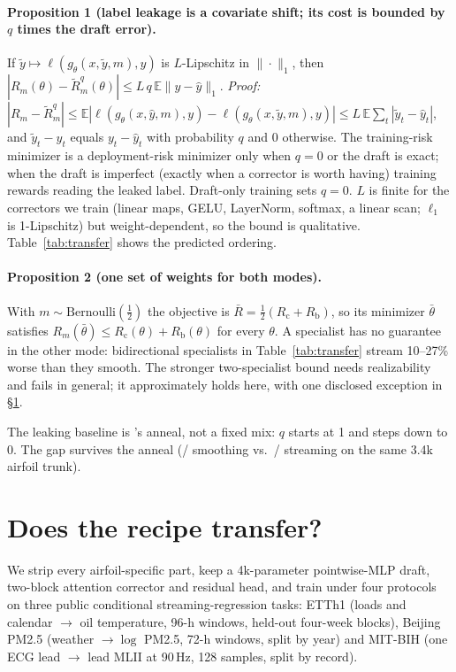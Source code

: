 \documentclass{article}
\begin{document}
\paragraph{Proposition 1 (label leakage is a covariate shift; its cost is bounded by $q$ times the draft error).} If $\tilde y\mapsto\ell(g_\theta(x,\tilde y,m),y)$ is $L$-Lipschitz in $\|\cdot\|_1$, then $|R_m(\theta)-\tilde R^q_m(\theta)|\le L\,q\,\mathbb{E}\|y-\hat y\|_1$. \emph{Proof:} $|R_m-\tilde R^q_m|\le\mathbb{E}|\ell(g_\theta(x,\hat y,m),y)-\ell(g_\theta(x,\tilde y,m),y)|\le L\,\mathbb{E}\sum_t|\tilde y_t-\hat y_t|$, and $\tilde y_t-\hat y_t$ equals $y_t-\hat y_t$ with probability $q$ and $0$ otherwise. The training-risk minimizer is a deployment-risk minimizer only when $q=0$ or the draft is exact; when the draft is imperfect (exactly when a corrector is worth having) training rewards reading the leaked label. Draft-only training sets $q=0$. $L$ is finite for the correctors we train (linear maps, GELU, LayerNorm, softmax, a linear scan; $\ell_1$ is 1-Lipschitz) but weight-dependent, so the bound is qualitative. Table~\ref{tab:transfer} shows the predicted ordering.

\paragraph{Proposition 2 (one set of weights for both modes).} With $m\sim\mathrm{Bernoulli}(\tfrac12)$ the objective is $\bar R=\tfrac12(R_\mathrm{c}+R_\mathrm{b})$, so its minimizer $\bar\theta$ satisfies $R_m(\bar\theta)\le R_\mathrm{c}(\theta)+R_\mathrm{b}(\theta)$ for every $\theta$. A specialist has no guarantee in the other mode: bidirectional specialists in Table~\ref{tab:transfer} stream 10--27\% worse than they smooth. The stronger two-specialist bound needs realizability and fails in general; it approximately holds here, with one disclosed exception in \S\ref{sec:transfer}.

The leaking baseline is \citet{bengio2015scheduled}'s anneal, not a fixed mix: $q$ starts at 1 and steps down to 0. The gap survives the anneal (\OldClTF/\OldCdTF{} smoothing vs.\ \OldClAR/\OldCdAR{} streaming on the same 3.4k airfoil trunk).

\section{Does the recipe transfer?}
\label{sec:transfer}
We strip every airfoil-specific part, keep a 4k-parameter pointwise-MLP draft, two-block attention corrector and residual head, and train under four protocols on three public conditional streaming-regression tasks: ETTh1 (loads and calendar $\rightarrow$ oil temperature, 96-h windows, held-out four-week blocks), Beijing PM2.5 (weather $\rightarrow\log$ PM2.5, 72-h windows, split by year) and MIT-BIH (one ECG lead $\rightarrow$ lead MLII at 90\,Hz, 128 samples, split by record).
\end{document}
